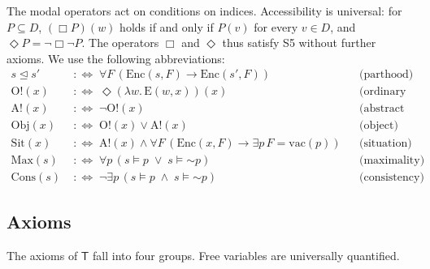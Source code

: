 \documentclass[11pt]{amsart}
\theoremstyle{plain}
\theoremstyle{definition}
\theoremstyle{remark}
\newcommand{\Sit}{\mathrm{Sit}}
\newcommand{\Obj}{\mathrm{Obj}}
\newcommand{\Enc}{\mathrm{Enc}}
\newcommand{\Conc}{\mathrm{E}}
\newcommand{\VAC}{\mathrm{vac}}
\newcommand{\Max}{\mathrm{Max}}
\newcommand{\Cons}{\mathrm{Cons}}
\newcommand{\Ord}{\mathrm{O!}}
\newcommand{\Abs}{\mathrm{A!}}
\newcommand{\partof}{\trianglelefteq}
\newcommand{\Dom}{D}
\newcommand{\T}{\mathsf{T}}
\newcommand{\pneg}{\mathord{\sim}}
\begin{document}
The modal operators act on conditions on indices. Accessibility is
universal: for $P \subseteq \Dom$, $(\Box P)(w)$ holds if and only if
$P(v)$ for every $v \in \Dom$, and $\Diamond P = \neg\Box\neg P$. The
operators $\Box$ and $\Diamond$ thus satisfy S5 without further axioms.
We use the following abbreviations:
\begin{align*}
  s \partof s' &\;:\Longleftrightarrow\; \forall F\,
    (\Enc(s,F) \to \Enc(s',F)) &&\text{(parthood)}\\
  \Ord(x) &\;:\Longleftrightarrow\;
    \Diamond(\lambda w.\,\Conc(w,x))(x) &&\text{(ordinary object)}\\
  \Abs(x) &\;:\Longleftrightarrow\; \neg\Ord(x)
    &&\text{(abstract object)}\\
  \Obj(x) &\;:\Longleftrightarrow\; \Ord(x) \vee \Abs(x)
    &&\text{(object)}\\
  \Sit(x) &\;:\Longleftrightarrow\; \Abs(x) \wedge \forall F\,
    (\Enc(x,F) \to \exists p\, F = \VAC(p)) &&\text{(situation)}\\
  \Max(s) &\;:\Longleftrightarrow\; \forall p\,
    (s \models p \;\vee\; s \models \pneg p) &&\text{(maximality)}\\
  \Cons(s) &\;:\Longleftrightarrow\; \neg\exists p\,
    (s \models p \;\wedge\; s \models \pneg p) &&\text{(consistency)}
\end{align*}

\subsection{Axioms}

The axioms of $\T$ fall into four groups. Free variables are
universally quantified.
\end{document}
